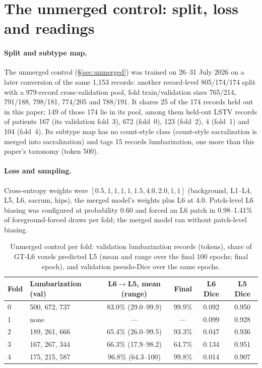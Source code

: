 \section{The unmerged control: split, loss and readings}
\label{app:unmerged}

\paragraph{Split and subtype map.}
The unmerged control (\S\ref{sec:unmerged}) was trained on
26--31 July 2026 on a later conversion of the same 1{,}153
records: another record-level 805/174/174 split with a
979-record cross-validation pool, fold train/validation
sizes 765/214, 791/188, 798/181, 774/205 and 788/191. It
shares 25 of the 174 records held out in this paper; 149
of those 174 lie in its pool, among them held-out LSTV
records of patients 167 (its validation fold~3), 672
(fold~0), 123 (fold~2), 4 (fold~1) and 104 (fold~4). Its
subtype map has no count-style class (count-style
sacralization is merged into sacralization) and tags 15
records lumbarization, one more than this paper's
taxonomy (token 500).

\paragraph{Loss and sampling.}
Cross-entropy weights were
$[0.5,1,1,1,1,1.5,4.0,2.0,1,1]$ (background, L1--L4, L5,
L6, sacrum, hips), the merged model's weights plus L6 at
4.0. Patch-level L6 biasing was configured at probability
0.60 and forced an L6 patch in 0.98--1.41\% of
foreground-forced draws per fold; the merged model ran
without patch-level biasing.

\begin{table}[h]
\caption{Unmerged control per fold: validation
lumbarization records (tokens), share of GT-L6 voxels
predicted L5 (mean and range over the final 100 epochs;
final epoch), and validation pseudo-Dice over the same
epochs.}
\label{tab:unmerged_folds}
\centering
\small
\begin{tabular}{llcccc}
\toprule
\bfseries Fold & \bfseries Lumbarization (val) & \bfseries L6$\to$L5, mean (range) & \bfseries Final & \bfseries L6 Dice & \bfseries L5 Dice \\
\midrule
0 & 500, 672, 737 & 83.0\% (29.0--99.9) & 99.9\% & 0.092 & 0.950 \\
1 & none          & ---                 & ---    & 0.099 & 0.928 \\
2 & 189, 261, 666 & 65.4\% (26.0--99.5) & 93.3\% & 0.047 & 0.936 \\
3 & 167, 267, 344 & 66.3\% (17.9--98.2) & 64.7\% & 0.134 & 0.951 \\
4 & 175, 215, 587 & 96.8\% (64.3--100)  & 99.8\% & 0.014 & 0.907 \\
\bottomrule
\end{tabular}
\end{table}

